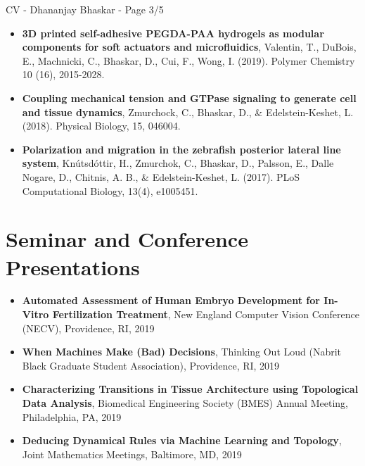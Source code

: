 \documentclass[margin,line]{res}
\begin{document}
\begin{resume}
\newpage
\begin{flushright}
CV - Dhananjay Bhaskar - Page 3/5
\end{flushright}
\vspace*{.2cm}

{\renewcommand\leftmargini{0em}
\begin{itemize}
\item{\bf 3D printed self-adhesive PEGDA-PAA hydrogels as modular components for soft actuators and microfluidics}, Valentin, T., DuBois, E., Machnicki, C., Bhaskar, D., Cui, F., Wong, I. (2019). Polymer Chemistry 10 (16), 2015-2028.
\vspace*{.1cm}
\item {\bf Coupling mechanical tension and GTPase signaling to generate cell and tissue dynamics}, Zmurchock, C., Bhaskar, D., \& Edelstein-Keshet, L. (2018). Physical Biology, 15, 046004.
\vspace*{.1cm}
\item{\bf Polarization and migration in the zebrafish posterior lateral line system}, Kn\'{u}tsd\'{o}ttir, H., Zmurchok, C., Bhaskar, D., Palsson, E., Dalle Nogare, D., Chitnis, A. B., \& Edelstein-Keshet, L. (2017). PLoS Computational Biology, 13(4), e1005451.
\end{itemize}
}

\vspace*{.3cm}

\section{\sc Seminar and Conference Presentations}

{\renewcommand\leftmargini{0em}
\begin{itemize}
\item {\bf Automated Assessment of Human Embryo Development for In-Vitro Fertilization Treatment}, New England Computer Vision Conference (NECV), Providence, RI, 2019

\item {\bf When Machines Make (Bad) Decisions}, Thinking Out Loud (Nabrit Black Graduate Student Association), Providence, RI, 2019

\item {\bf Characterizing Transitions in Tissue Architecture using Topological Data Analysis}, Biomedical Engineering Society (BMES) Annual Meeting, Philadelphia, PA, 2019

\item {\bf Deducing Dynamical Rules via Machine Learning and Topology}, Joint Mathematics Meetings, Baltimore, MD, 2019


\end{itemize}}
\end{resume}
\end{document}
